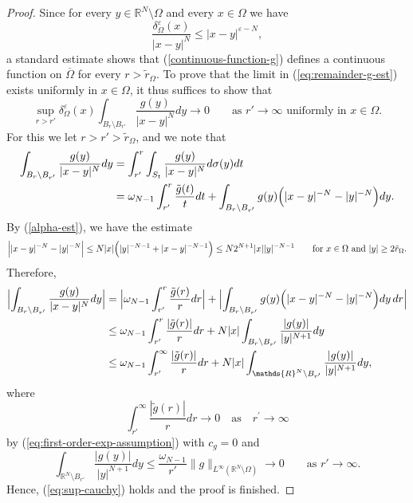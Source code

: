 \documentclass[notitlepage,11pt,reqno]{amsart}
\theoremstyle{definition}
\numberwithin{equation}{section}
\newcommand{\eps}{{\varepsilon}}
\newcommand{\R}{\mathds{R}}
\newcommand{\RR}{\mathds{R}}
\begin{document}
  \begin{proof}
    Since for every $y \in \R^N \setminus \Omega$ and every $x \in \Omega$ we have
    $$
    \frac{\delta_\Omega^\eps(x)}{|x-y|^N} \le |x-y|^{\eps-N},
    $$
a standard estimate shows that (\ref{continuous-function-g}) defines a continuous function on $\overline{\Omega}$ for every $r > \tilde r_\Omega$. To prove that the limit in (\ref{eq:remainder-g-est}) exists uniformly in $x \in \Omega$, it thus  suffices to show that
    \begin{equation}
      \label{eq:sup-cauchy}
      \sup_{r>r'} \delta^{\varepsilon}_{\Omega}(x)\int_{B_r \setminus B_{r'}}\frac{g(y)}{|x-y|^{N}}dy \to 0 \qquad \text{as $r' \to \infty$ uniformly in $x \in \Omega$.}   
    \end{equation}
 For this we let $r>r' > \tilde r_\Omega$,  and we note that
    \begin{align*}
        \int_{B_r \setminus B_{r'}}\frac{g(y)}{|x-y|^{N}}dy &= \int_{r'}^{r} \int_{S_t}\frac{g(y)}{|x-y|^{N}}d\sigma(y)dt\\
                                                                  &= \omega_{N-1}\int_{r'}^{r}\frac{\tilde g(t)}{t} dt + \int_{B_r \setminus B_{r'}} g(y)\Bigl(|x-y|^{-N}-|y|^{-N}\Bigr)dy.
      \end{align*}
By (\ref{alpha-est}), we have the estimate
      $$
      \Bigl||x-y|^{-N}-|y|^{-N}\Bigr| \le N |x|\Bigl(|y|^{-N-1} + |x-y|^{-N-1}\Bigr) \le N2^{N+1} |x| |y|^{-N-1}\qquad \text{for $x \in \Omega$ and $|y| \ge 2\tilde r_\Omega$.}
      $$
      Therefore,   
      \begin{align*}
        \Bigl|\int_{B_r \setminus B_{r'}}\frac{g(y)}{|x-y|^{N}}dy\Bigr|&=\Bigl| \omega_{N-1}\int_{r'}^{r}\frac{\tilde g(r)}{r} dr\Bigr|+  \Bigl|\int_{B_r \setminus B_{r'}} g(y)\Bigl(|x-y|^{-N}-|y|^{-N}\Bigr)dy\, dr\Bigr|\\
        &\le \omega_{N-1}\int_{r'}^{r}\frac{|\tilde g(r)|}{r} dr  + N|x| \int_{B_r \setminus B_{r'}} \frac{|g(y)|}{|y|^{N+1}}dy\\
        &\le \omega_{N-1}\int_{r'}^{\infty}\frac{|\tilde g(r)|}{r} dr + N|x| \int_{\RR^N \setminus B_{r'}} \frac{|g(y)|}{|y|^{N+1}}dy,
      \end{align*}
      where
      $$
      \int_{r'}^{\infty}\frac{|\tilde g(r)|}{r} dr \to 0 \quad \text{as}\quad r^{\prime}\to \infty
      $$
      by (\ref{eq:first-order-exp-assumption}) with $c_g =0$ and
      $$
      \int_{\RR^N \setminus B_{r'}} \frac{|g(y)|}{|y|^{N+1}}dy \le \frac{\omega_{N-1}}{r'} \|g\|_{L^\infty(\RR^N\setminus \Omega)} \to 0 \qquad \text{as $r' \to \infty$.}
      $$
      Hence, (\ref{eq:sup-cauchy}) holds and the proof is finished.
  \end{proof}
  
\end{document}
